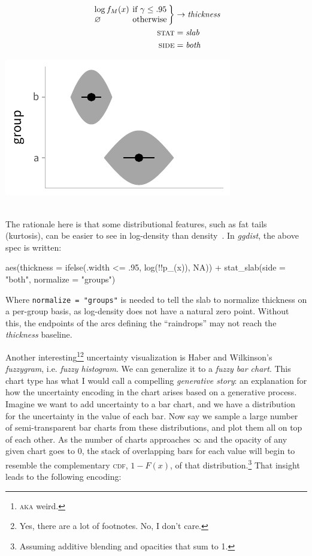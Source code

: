\documentclass[journal]{vgtc}                     %
\newenvironment{centerverbatim}{%
\setlength{\parskip}{.4\belowdisplayskip}%
\vspace{.55\abovedisplayskip}%
\noindent%
\small%
\centering%
\varwidth{\linewidth}%
\verbatim
}{%
\endverbatim%
\endvarwidth%
\par%
\hfill\break%
}
\newcommand{\equationfigure}[2]{%
\noindent
\begin{minipage}{.5\columnwidth}
\setlength{\abovedisplayskip}{0pt}
\setlength{\belowdisplayskip}{0pt}
#1\end{minipage}%
\begin{minipage}{.4\columnwidth}\centering #2 \end{minipage}%
\vspace{.5\belowdisplayskip}\\
}
\begin{document}
\equationfigure{
\begin{align*}
\arraycolsep=2pt \left.\begin{array}{ll} \log f_M(x) & \textrm{if } \gamma \le .95\\ \varnothing & \textrm{otherwise}\end{array}\right\} &\rightarrow \textit{thickness}\\
\textsc{stat} &= \mathit{slab}\\
\textsc{side} &= \mathit{both}
\end{align*}
}{\includegraphics[width=1.2\columnwidth]{figs/3-slab_raindrop.pdf}}
The rationale here is that some distributional features, such as fat tails (kurtosis), can be easier to see in log-density than density~\cite{barrowman2003raindrop}. In \textit{ggdist}, the above spec is written:

\begin{centerverbatim}
aes(thickness = ifelse(.width <= .95, log(!!p_(x)), NA)) +
stat_slab(side = "both", normalize = "groups")
\end{centerverbatim}
Where \texttt{normalize = "groups"} is needed to tell the slab to normalize thickness on a per-group basis, as log-density does not have a natural zero point. Without this, the endpoints of the arcs defining the ``raindrops'' may not reach the \textit{thickness} baseline.

Another interesting\footnote{\textsc{aka} weird.}\footnote{Yes, there are a lot of footnotes. No, I don't care.} uncertainty visualization is Haber and Wilkinson's~\cite{haber1982perceptual} \textit{fuzzygram}, i.e. \textit{fuzzy histogram}. We can generalize it to a \textit{fuzzy bar chart}. This chart type has what I would call a compelling \textit{generative story}: an explanation for how the uncertainty encoding in the chart arises based on a generative process. Imagine we want to add uncertainty to a bar chart, and we have a distribution for the uncertainty in the value of each bar. Now say we sample a large number of semi-transparent bar charts from these distributions, and plot them all on top of each other. As the number of charts approaches $\infty$ and the opacity of any given chart goes to 0, the stack of overlapping bars for each value will begin to resemble the complementary \textsc{cdf}, $1 - F(x)$, of that distribution.\footnote{Assuming additive blending and opacities that sum to 1.} That insight leads to the following encoding:
\end{document}
